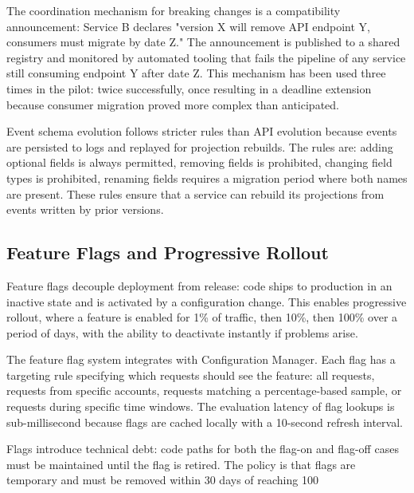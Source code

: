 The coordination mechanism for breaking changes is a compatibility announcement: Service B declares "version X will remove API endpoint Y, consumers must migrate by date Z." The announcement is published to a shared registry and monitored by automated tooling that fails the pipeline of any service still consuming endpoint Y after date Z. This mechanism has been used three times in the pilot: twice successfully, once resulting in a deadline extension because consumer migration proved more complex than anticipated.

Event schema evolution follows stricter rules than API evolution because events are persisted to logs and replayed for projection rebuilds. The rules are: adding optional fields is always permitted, removing fields is prohibited, changing field types is prohibited, renaming fields requires a migration period where both names are present. These rules ensure that a service can rebuild its projections from events written by prior versions.

\subsection{Feature Flags and Progressive Rollout}

Feature flags decouple deployment from release: code ships to production in an inactive state and is activated by a configuration change. This enables progressive rollout, where a feature is enabled for 1\% of traffic, then 10\%, then 100\% over a period of days, with the ability to deactivate instantly if problems arise.

The feature flag system integrates with Configuration Manager. Each flag has a targeting rule specifying which requests should see the feature: all requests, requests from specific accounts, requests matching a percentage-based sample, or requests during specific time windows. The evaluation latency of flag lookups is sub-millisecond because flags are cached locally with a 10-second refresh interval.

Flags introduce technical debt: code paths for both the flag-on and flag-off cases must be maintained until the flag is retired. The policy is that flags are temporary and must be removed within 30 days of reaching 100%

